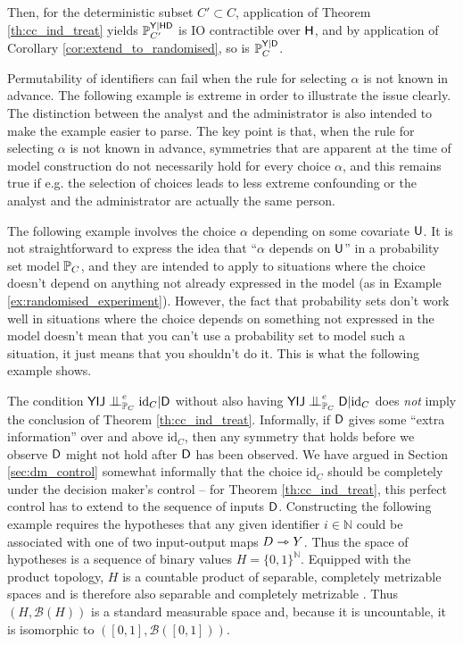 \begin{example}
Then, for the deterministic subset $C'\subset C$, application of Theorem \ref{th:cc_ind_treat} yields $\mathbb{P}_{C'}^{\mathsf{Y}|\mathsf{HD}}$ is IO contractible over $\mathsf{H}$, and by application of Corollary \ref{cor:extend_to_randomised}, so is $\mathbb{P}_{C}^{\mathsf{Y}|\mathsf{D}}$.
\end{example}

Permutability of identifiers can fail when the rule for selecting $\alpha$ is not known in advance. The following example is extreme in order to illustrate the issue clearly. The distinction between the analyst and the administrator is also intended to make the example easier to parse. The key point is that, when the rule for selecting $\alpha$ is not known in advance, symmetries that are apparent at the time of model construction do not necessarily hold for every choice $\alpha$, and this remains true if e.g. the selection of choices leads to less extreme confounding or the analyst and the administrator are actually the same person.

The following example involves the choice $\alpha$ depending on some covariate $\mathsf{U}$. It is not straightforward to express the idea that ``$\alpha$ depends on $\mathsf{U}$'' in a probability set model $\mathbb{P}_C$, and they are intended to apply to situations where the choice doesn't depend on anything not already expressed in the model (as in Example \ref{ex:randomised_experiment}). However, the fact that probability sets don't work well in situations where the choice depends on something not expressed in the model doesn't mean that you can't use a probability set to model such a situation, it just means that you shouldn't do it. This is what the following example shows.

The condition $\RV{YIJ}\CI^e_{\prob{P}_C} \text{id}_C|\RV{D}$ without also having $\RV{YIJ}\CI^e_{\prob{P}_C} \RV{D}|\text{id}_C$ does \emph{not} imply the conclusion of Theorem \ref{th:cc_ind_treat}. Informally, if $\mathsf{D}$ gives some ``extra information'' over and above $\text{id}_C$, then any symmetry that holds before we observe $\mathsf{D}$ might not hold after $\mathsf{D}$ has been observed. We have argued in Section \ref{sec:dm_control} somewhat informally that the choice $\text{id}_C$ should be completely under the decision maker's control -- for Theorem \ref{th:cc_ind_treat}, this perfect control has to extend to the sequence of inputs $\mathsf{D}$. Constructing the following example requires the hypotheses that any given identifier $i\in\mathbb{N}$ could be associated with one of two input-output maps $D\rightarrowtriangle Y$. Thus the space of hypotheses is a sequence of binary values $H=\{0,1\}^{\mathbb{N}}$. Equipped with the product topology, $H$ is a countable product of separable, completely metrizable spaces and is therefore also separable and completely metrizable \citep[Thm. 16.4,Thm. 24.11]{willard_general_1970}. Thus $(H,\mathcal{B}(H))$ is a standard measurable space and, because it is uncountable, it is isomorphic to $([0,1],\mathcal{B}([0,1]))$.

